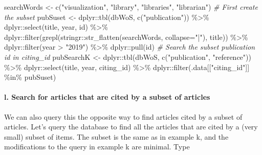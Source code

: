 \documentclass[
]{article}
\newenvironment{Shaded}{\begin{snugshade}}{\end{snugshade}}
\newcommand{\AttributeTok}[1]{\textcolor[rgb]{0.77,0.63,0.00}{#1}}
\newcommand{\CommentTok}[1]{\textcolor[rgb]{0.56,0.35,0.01}{\textit{#1}}}
\newcommand{\FunctionTok}[1]{\textcolor[rgb]{0.00,0.00,0.00}{#1}}
\newcommand{\NormalTok}[1]{#1}
\newcommand{\OtherTok}[1]{\textcolor[rgb]{0.56,0.35,0.01}{#1}}
\newcommand{\SpecialCharTok}[1]{\textcolor[rgb]{0.00,0.00,0.00}{#1}}
\newcommand{\StringTok}[1]{\textcolor[rgb]{0.31,0.60,0.02}{#1}}
\begin{document}
\begin{Shaded}
\begin{Highlighting}[]
\NormalTok{searchWords }\OtherTok{\textless{}{-}} \FunctionTok{c}\NormalTok{(}\StringTok{"visualization"}\NormalTok{, }\StringTok{"library"}\NormalTok{, }\StringTok{"libraries"}\NormalTok{, }\StringTok{"librarian"}\NormalTok{)}
\CommentTok{\# First create the subset}
\NormalTok{pubSuset }\OtherTok{\textless{}{-}}\NormalTok{ dplyr}\SpecialCharTok{::}\FunctionTok{tbl}\NormalTok{(dbWoS, }\FunctionTok{c}\NormalTok{(}\StringTok{"publication"}\NormalTok{)) }\SpecialCharTok{\%\textgreater{}\%}
\NormalTok{  dplyr}\SpecialCharTok{::}\FunctionTok{select}\NormalTok{(title, year, id) }\SpecialCharTok{\%\textgreater{}\%}
\NormalTok{  dplyr}\SpecialCharTok{::}\FunctionTok{filter}\NormalTok{(}\FunctionTok{grepl}\NormalTok{(stringr}\SpecialCharTok{::}\FunctionTok{str\_flatten}\NormalTok{(searchWords, }\AttributeTok{collapse=}\StringTok{"|"}\NormalTok{), title)) }\SpecialCharTok{\%\textgreater{}\%}
\NormalTok{  dplyr}\SpecialCharTok{::}\FunctionTok{filter}\NormalTok{(year }\SpecialCharTok{\textgreater{}} \StringTok{"2019"}\NormalTok{) }\SpecialCharTok{\%\textgreater{}\%}
\NormalTok{  dplyr}\SpecialCharTok{::}\FunctionTok{pull}\NormalTok{(id) }
\CommentTok{\# Search the subset publication id in citing\_id}
\NormalTok{pubSearchK }\OtherTok{\textless{}{-}}\NormalTok{ dplyr}\SpecialCharTok{::}\FunctionTok{tbl}\NormalTok{(dbWoS, }\FunctionTok{c}\NormalTok{(}\StringTok{"publication"}\NormalTok{, }\StringTok{"reference"}\NormalTok{)) }\SpecialCharTok{\%\textgreater{}\%}
\NormalTok{  dplyr}\SpecialCharTok{::}\FunctionTok{select}\NormalTok{(title, year, citing\_id) }\SpecialCharTok{\%\textgreater{}\%}
\NormalTok{  dplyr}\SpecialCharTok{::}\FunctionTok{filter}\NormalTok{(.data[[}\StringTok{"citing\_id"}\NormalTok{]] }\SpecialCharTok{\%in\%}\NormalTok{ pubSuset)}
\end{Highlighting}
\end{Shaded}

\hypertarget{l.-search-for-articles-that-are-cited-by-a-subset-of-articles}{%
\paragraph{l. Search for articles that are cited by a subset of
articles}\label{l.-search-for-articles-that-are-cited-by-a-subset-of-articles}}

We can also query this the opposite way to find articles cited by a
subset of articles. Let's query the database to find all the articles
that are cited by a (very small) subset of items. The subset is the same
as in example k, and the modifications to the query in example k are
minimal. Type
\end{document}
